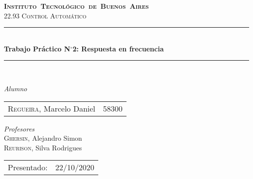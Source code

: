 \begin{titlepage}
\newcommand{\HRule}{\rule{\linewidth}{0.5mm}}
\center
\mbox{\textsc{\LARGE \bfseries {Instituto Tecnol\'ogico de Buenos Aires}}}\\[1.5cm]
\textsc{\Large 22.93 Control Autom\'atico}\\[0.5cm]


\HRule \\[0.6cm]
{ \Huge \bfseries Trabajo Pr\'actico N$^{\circ}$2: Respuesta en frecuencia}\\[0.4cm] %
\HRule \\[1.5cm]


{\large

\emph{Alumno}\\
\vspace{3px}

\begin{tabular}{lr} 	
\textsc{Regueira}, Marcelo Daniel  & 58300 \\
\end{tabular}

\vspace{20px}

\emph{Profesores}\\
\vspace{3px}
\textsc{Ghersin}, Alejandro Simon\\ 	
\textsc{Reurison}, Silva Rodrigues\\ 	

\vspace{220px}

\begin{tabular}{ll}

Presentado: & 22/10/2020\\

\end{tabular}

}

\vfill

\end{titlepage}